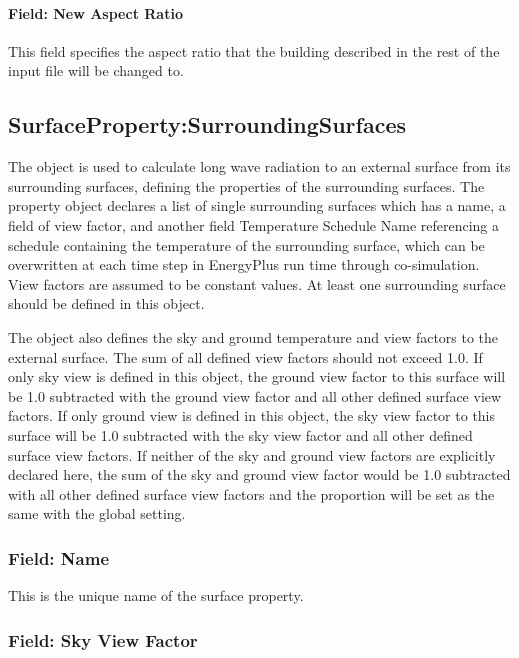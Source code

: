 \paragraph{Field: New Aspect Ratio}\label{field-new-aspect-ratio}

This field specifies the aspect ratio that the building described in the rest of the input file will be changed to.

\subsection{SurfaceProperty:SurroundingSurfaces}\label{surfacePropertysurroundingSurfaces}

The object is used to calculate long wave radiation to an external surface from its surrounding surfaces, defining the properties of the surrounding surfaces. The property object declares a list of single surrounding surfaces which has a name, a field of view factor, and another field Temperature Schedule Name referencing a schedule containing the temperature of the surrounding surface, which can be overwritten at each time step in EnergyPlus run time through co-simulation. View factors are assumed to be constant values. At least one surrounding surface should be defined in this object.

The object also defines the sky and ground temperature and view factors to the external surface. The sum of all defined view factors should not exceed 1.0. If only sky view is defined in this object, the ground view factor to this surface will be 1.0 subtracted with the ground view factor and all other defined surface view factors. If only ground view is defined in this object, the sky view factor to this surface will be 1.0 subtracted with the sky view factor and all other defined surface view factors. If neither of the sky and ground view factors are explicitly declared here, the sum of the sky and ground view factor would be 1.0 subtracted with all other defined surface view factors and the proportion will be set as the same with the global setting.

\subsubsection{Field: Name}\label{field-srd-surfs-name}

This is the unique name of the surface property.

\subsubsection{Field: Sky View Factor}\label{field-sky-view-factor}

